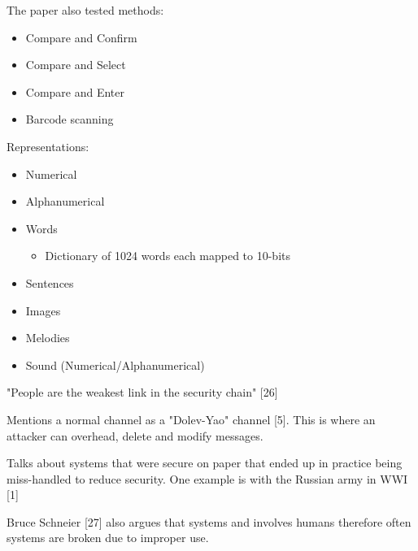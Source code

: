 The paper also tested methods:
\begin{itemize}
    \item Compare and Confirm
    \item Compare and Select
    \item Compare and Enter
    \item Barcode scanning
\end{itemize}

Representations:
\begin{itemize}
    \item Numerical
    \item Alphanumerical
    \item Words
    \begin{itemize}
        \item Dictionary of 1024 words each mapped to 10-bits
    \end{itemize}
    \item Sentences
    \item Images
    \item Melodies
    \item Sound (Numerical/Alphanumerical)
\end{itemize}

"People are the weakest link in the security chain" [26]

Mentions a normal channel as a "Dolev-Yao" channel [5]. This is where an attacker can overhead, delete and modify messages.

Talks about systems that were secure on paper that ended up in practice being miss-handled to reduce security. One example is with the Russian army in WWI [1]

Bruce Schneier [27] also argues that systems and involves humans therefore often systems are broken due to improper use.


